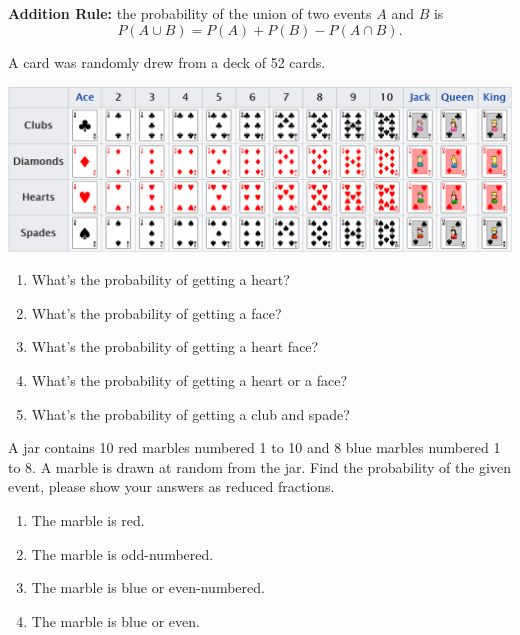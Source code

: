 \textbf{Addition Rule:} the probability of the union of two events
\(A\) and \(B\) is \[
P(A\cup B)=P(A)+P(B)-P(A\cap B).
\]

\begin{example}
  A card was randomly drew from a deck of 52 cards.
  
\begin{fullwidth}
  \centering
  \includegraphics[width=\linewidth]{Figures/Standard-52-card-from-Wikipedia.png}
\end{fullwidth}  
  \begin{enumerate}
  \item
    What's the probability of getting a heart?
  \item
    What's the probability of getting a face?
  \item
    What's the probability of getting a heart face?
  \item
    What's the probability of getting a heart or a face?
  \item
    What's the probability of getting a club and spade?
  \end{enumerate}
\end{example}



\begin{exercise}

A jar contains 10 red marbles numbered 1 to 10 and 8 blue marbles numbered 1 to 8. A marble is drawn at random from the jar. Find the probability of the given event, please show your answers as reduced fractions.

\begin{enumerate}
  \item The marble is red.
  \item The marble is odd-numbered.
  \item The marble is blue or even-numbered.
  \item The marble is blue or even.
\end{enumerate}

\end{exercise}

